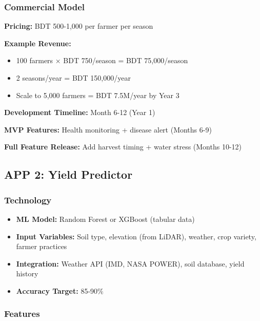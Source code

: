\subsubsection{Commercial Model}

\textbf{Pricing:} BDT 500-1,000 per farmer per season

\textbf{Example Revenue:}
\begin{itemize}
    \item 100 farmers × BDT 750/season = BDT 75,000/season
    \item 2 seasons/year = BDT 150,000/year
    \item Scale to 5,000 farmers = BDT 7.5M/year by Year 3
\end{itemize}

\textbf{Development Timeline:} Month 6-12 (Year 1)

\textbf{MVP Features:} Health monitoring + disease alert (Months 6-9)

\textbf{Full Feature Release:} Add harvest timing + water stress (Months 10-12)

\subsection{APP 2: Yield Predictor}

\subsubsection{Technology}

\begin{itemize}
    \item \textbf{ML Model:} Random Forest or XGBoost (tabular data)
    \item \textbf{Input Variables:} Soil type, elevation (from LiDAR), weather, crop variety, farmer practices
    \item \textbf{Integration:} Weather API (IMD, NASA POWER), soil database, yield history
    \item \textbf{Accuracy Target:} 85-90\%
\end{itemize}

\subsubsection{Features}

